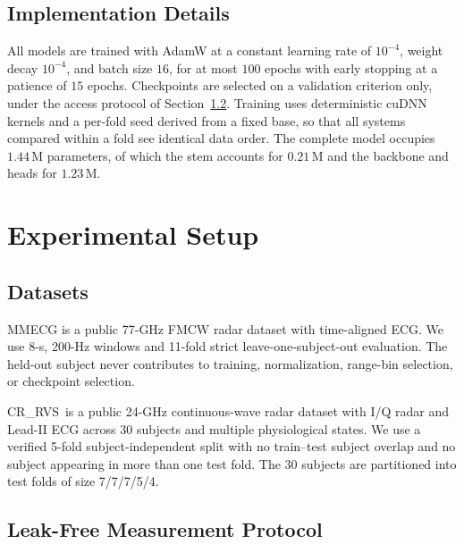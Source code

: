 \documentclass[lettersize,journal]{IEEEtran}
\newcommand{\crrvs}{CR\_RVS\xspace}
\begin{document}
\subsection{Implementation Details}
All models are trained with AdamW at a constant learning rate of $10^{-4}$, weight decay $10^{-4}$, and batch size $16$, for at most $100$ epochs with early stopping at a patience of $15$ epochs. Checkpoints are selected on a validation criterion only, under the access protocol of Section~\ref{sec:protocol}. Training uses deterministic cuDNN kernels and a per-fold seed derived from a fixed base, so that all systems compared within a fold see identical data order. The complete model occupies $1.44$\,M parameters, of which the stem accounts for $0.21$\,M and the backbone and heads for $1.23$\,M.

\section{Experimental Setup}
\label{sec:setup}

\subsection{Datasets}
MMECG is a public 77-GHz FMCW radar dataset with time-aligned ECG. We use 8-s, 200-Hz windows and 11-fold strict leave-one-subject-out evaluation. The held-out subject never contributes to training, normalization, range-bin selection, or checkpoint selection.

\crrvs\ is a public 24-GHz continuous-wave radar dataset with I/Q radar and Lead-II ECG across 30 subjects and multiple physiological states. We use a verified 5-fold subject-independent split with no train--test subject overlap and no subject appearing in more than one test fold. The 30 subjects are partitioned into test folds of size 7/7/7/5/4.

\subsection{Leak-Free Measurement Protocol}
\label{sec:protocol}
\end{document}
